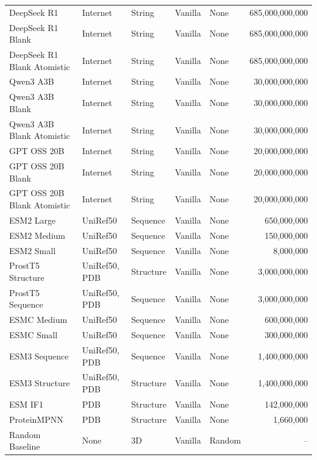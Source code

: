 \documentclass[11pt]{article}
\begin{document}
\begin{table}[htbp]
{\begin{tabular}{l l l l l r}
DeepSeek R1 & Internet & String & Vanilla & None & 685,000,000,000 \\
DeepSeek R1 Blank & Internet & String & Vanilla & None & 685,000,000,000 \\
DeepSeek R1 Blank Atomistic & Internet & String & Vanilla & None & 685,000,000,000 \\
Qwen3 A3B & Internet & String & Vanilla & None & 30,000,000,000 \\
Qwen3 A3B Blank & Internet & String & Vanilla & None & 30,000,000,000 \\
Qwen3 A3B Blank Atomistic & Internet & String & Vanilla & None & 30,000,000,000 \\
GPT OSS 20B & Internet & String & Vanilla & None & 20,000,000,000 \\
GPT OSS 20B Blank & Internet & String & Vanilla & None & 20,000,000,000 \\
GPT OSS 20B Blank Atomistic& Internet & String & Vanilla & None & 20,000,000,000 \\
ESM2 Large & UniRef50 & Sequence & Vanilla & None & 650,000,000 \\ 
ESM2 Medium & UniRef50 & Sequence & Vanilla & None & 150,000,000 \\
ESM2 Small & UniRef50 & Sequence & Vanilla & None & 8,000,000 \\
ProstT5 Structure & UniRef50, PDB & Structure & Vanilla & None & 3,000,000,000 \\
ProstT5 Sequence & UniRef50, PDB & Sequence & Vanilla & None & 3,000,000,000 \\
ESMC Medium & UniRef50 & Sequence & Vanilla & None & 600,000,000 \\
ESMC Small & UniRef50 & Sequence & Vanilla & None & 300,000,000 \\
ESM3 Sequence & UniRef50, PDB & Sequence & Vanilla & None & 1,400,000,000 \\
ESM3 Structure & UniRef50, PDB & Structure & Vanilla & None & 1,400,000,000 \\
ESM IF1 & PDB & Structure & Vanilla & None & 142,000,000 \\
ProteinMPNN & PDB & Structure & Vanilla & None & 1,660,000 \\
Random Baseline & None & 3D & Vanilla & Random & -- \\
\hline
\end{tabular}
}
\end{table}
\end{document}
